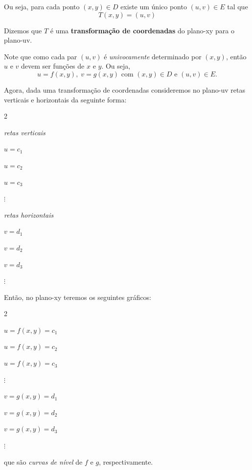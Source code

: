 Ou seja, para cada ponto \((x,y)\in D\) existe um único ponto \((u,v)\in E\) tal que \[T(x,y) = (u,v)\]

\begin{definition}
    Dizemos que \(T\) é uma \textbf{transformação de coordenadas} do plano-xy para o plano-uv.
\end{definition}

\begin{remark}
    Note que como cada par \((u,v)\) é \textit{univocamente} determinado por \((x,y)\), então \(u\) e \(v\) devem ser funções de \(x\) e \(y\). Ou seja, \[u = f(x,y),\; v = g(x,y) \text{ com } (x,y)\in D \text{ e } (u,v)\in E. \]
\end{remark}

Agora, dada uma transformação de coordenadas consideremos no plano-uv retas verticais e horizontais da seguinte forma:
    \begin{multicols}{2}
        \begin{center}
            \textit{retas verticais}

            \(u = c_1\)

            \(u = c_2\)

            \(u = c_3\)

            \(\vdots\)
        \end{center}

        \newcolumn

        \begin{center}
            \textit{retas horizontais}

            \(v = d_1\)

            \(v = d_2\)

            \(v = d_3\)

            \(\vdots\)
        \end{center}
    \end{multicols}

Então, no plano-xy teremos os seguintes gráficos:
    \begin{multicols}{2}
        \begin{center}
            \(u = f(x,y) = c_1\)

            \(u = f(x,y) = c_2\)

            \(u = f(x,y) = c_3\)

            \(\vdots\)
        \end{center}
        \newcolumn
        \begin{center}
            \(v = g(x,y) = d_1\)

            \(v = g(x,y) = d_2\)

            \(v = g(x,y) = d_3\)

            \(\vdots\)
        \end{center}
    \end{multicols}
que são \textit{curvas de nível} de \(f\) e \(g\), respectivamente.

